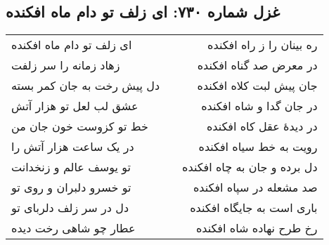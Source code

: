 \begin{center}
\section*{غزل شماره ۷۳۰: ای زلف تو دام ماه افکنده}
\label{sec:730}
\begin{longtable}{l p{0.5cm} r}
ای زلف تو دام ماه افکنده
&&
ره بینان را ز راه افکنده
\\
زهاد زمانه را سر زلفت
&&
در معرض صد گناه افکنده
\\
دل پیش رخت به جان کمر بسته
&&
جان پیش لبت کلاه افکنده
\\
عشق لب لعل تو هزار آتش
&&
در جان گدا و شاه افکنده
\\
خط تو کزوست خون جان من
&&
در دیدهٔ عقل کاه افکنده
\\
در یک ساعت هزار آتش را
&&
رویت به خط سیاه افکنده
\\
تو یوسف عالم و زنخدانت
&&
دل برده و جان به چاه افکنده
\\
تو خسرو دلبران و روی تو
&&
صد مشعله در سپاه افکنده
\\
دل در سر زلف دلربای تو
&&
باری است به جایگاه افکنده
\\
عطار چو شاهی رخت دیده
&&
رخ طرح نهاده شاه افکنده
\\
\end{longtable}
\end{center}
